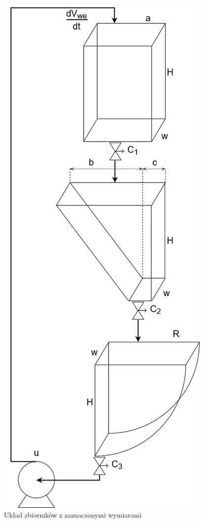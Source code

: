 \begin{figure}[hpt]
	\centering
	\includegraphics[scale=.5]{Grafika/schemat_zbiornikow}
	\caption{Układ zbiorników z zaznaczonymi wymiarami}\label{fig:zbiorniki}
\end{figure}








